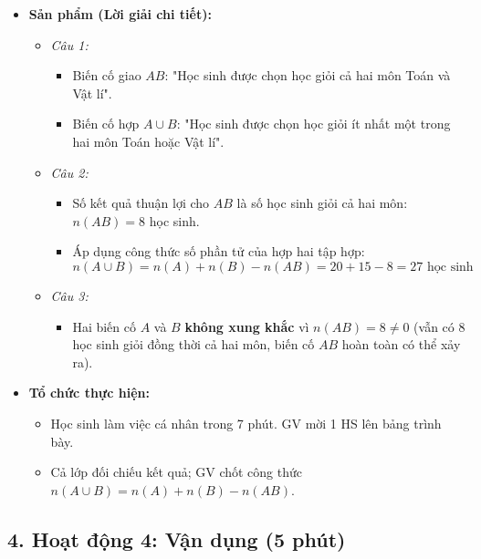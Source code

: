 \documentclass[12pt, a4paper]{article}
\begin{document}
\begin{itemize}[leftmargin=1.2cm]
    \item[c)] \textbf{Sản phẩm (Lời giải chi tiết):}
    \begin{itemize}[leftmargin=0.6cm]
        \item \textit{Câu 1:}
        \begin{itemize}
            \item Biến cố giao $AB$: "Học sinh được chọn học giỏi cả hai môn Toán và Vật lí".
            \item Biến cố hợp $A \cup B$: "Học sinh được chọn học giỏi ít nhất một trong hai môn Toán hoặc Vật lí".
        \end{itemize}
        \item \textit{Câu 2:}
        \begin{itemize}
            \item Số kết quả thuận lợi cho $AB$ là số học sinh giỏi cả hai môn: $n(AB) = 8$ học sinh.
            \item Áp dụng công thức số phần tử của hợp hai tập hợp:
            $$n(A \cup B) = n(A) + n(B) - n(AB) = 20 + 15 - 8 = 27 \text{ học sinh}$$
        \end{itemize}
        \item \textit{Câu 3:}
        \begin{itemize}
            \item Hai biến cố $A$ và $B$ \textbf{không xung khắc} vì $n(AB) = 8 \ne 0$ (vẫn có 8 học sinh giỏi đồng thời cả hai môn, biến cố $AB$ hoàn toàn có thể xảy ra).
        \end{itemize}
    \end{itemize}

    \item[d)] \textbf{Tổ chức thực hiện:}
    \begin{itemize}[leftmargin=0.6cm]
        \item Học sinh làm việc cá nhân trong 7 phút. GV mời 1 HS lên bảng trình bày.
        \item Cả lớp đối chiếu kết quả; GV chốt công thức $n(A \cup B) = n(A) + n(B) - n(AB)$.
    \end{itemize}
\end{itemize}

\subsection*{4. Hoạt động 4: Vận dụng (5 phút)}
\end{document}
